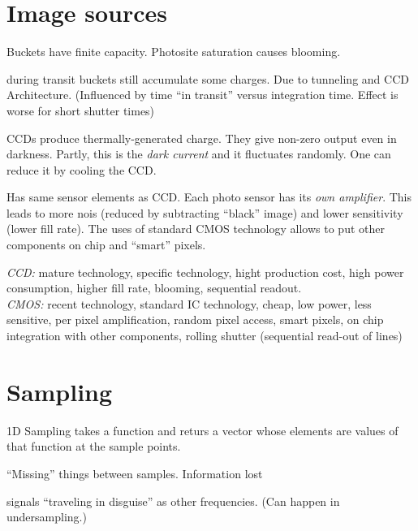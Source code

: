 \section{Image sources}
\begin{compactdesc}
	\item[\lp{digital camera (CCD)}]\hfill
	\item[\lp{analog to digital Conversion}]\hfill
	\item[\lp{Blooming}]
		Buckets have finite capacity. Photosite saturation causes blooming.
	\item[\lp{bleeding or smearing}] during transit buckets still accumulate some charges. Due to tunneling and CCD Architecture. (Influenced by time ``in transit'' versus integration time. Effect is worse for short shutter times)
	\item[\lp{dark current}] CCDs produce thermally-generated charge. They give non-zero output even in darkness. Partly, this is the \emph{dark current} and it fluctuates randomly. One can reduce it by cooling the CCD.
	\item[\lp{CMOS}] Has same sensor elements as CCD. Each photo sensor has its \emph{own amplifier}. This leads to more nois (reduced by subtracting ``black'' image) and lower sensitivity (lower fill rate). The uses of standard CMOS technology allows to put other components on chip and ``smart'' pixels.
	\item[\lp{CCD vs. CMOS}] \emph{CCD:} mature technology, specific technology, hight production cost, high power consumption, higher fill rate, blooming, sequential readout. \\\emph{CMOS:} recent technology, standard IC technology, cheap, low power, less sensitive, per pixel amplification, random pixel access, smart pixels, on chip integration with other components, rolling shutter (sequential read-out of lines)
\end{compactdesc}
\section{Sampling}
\begin{compactdesc}
	\item[1D] Sampling takes a function and returs a vector whose elements are values of that function at the sample points.
	\item[\lp{Undersampling}] ``Missing'' things between samples. Information lost
	\item[\lp{aliasing}] signals ``traveling in disguise'' as other frequencies. (Can happen in undersampling.)
\end{compactdesc}
